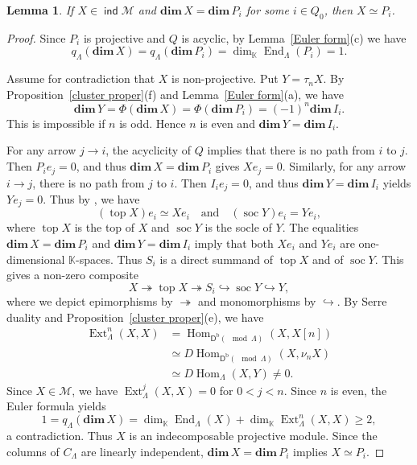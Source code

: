 \documentclass[11pt,a4paper]{amsart}
\newtheorem{lemma}[theorem]{Lemma}
\theoremstyle{definition}
\numberwithin{equation}{section}
\newcommand{\0}{\mathbf{0}}
\newcommand{\dimv}{\mathbf{dim}\,}
\newcommand{\Hom}{\operatorname{Hom}\nolimits}
\newcommand{\End}{\operatorname{End}\nolimits}
\newcommand{\Ext}{\operatorname{Ext}\nolimits}
\newcommand{\topp}{\operatorname{top}\nolimits}
\newcommand{\soc}{\operatorname{soc}\nolimits}
\newcommand{\bo}{\operatorname{b}\nolimits}
\DeclareMathOperator{\ind}{\mathsf{ind}}
\newcommand{\DDD}{\mathsf{D}}
\begin{document}
	
	
	\begin{lemma} \label{projective uniqueness} If $X\in \ind \mathcal{M}$ and $\dimv X=\dimv P_i$ for some $i\in Q_0$, then $X\simeq P_i$. 
		
	\end{lemma}
	\begin{proof}
		Since $P_i$ is projective and $Q$ is acyclic,
		by Lemma~\ref{Euler form}(c) we have
		\[
		q_\Lambda(\dimv X)
		=q_\Lambda(\dimv P_i)
		=\dim_{\mathbb K}\End_\Lambda(P_i)=1.
		\]				
		
		Assume for contradiction that $X$ is non-projective.  Put $Y=\tau_nX$.
		By Proposition~\ref{cluster proper}(f) and
		Lemma~\ref{Euler form}(a), we have
		\[
		\dimv Y=\Phi(\dimv X)
		=\Phi(\dimv P_i)=(-1)^n\dimv I_i.
		\]
		This is impossible if $n$ is odd. Hence $n$ is even
		and $\dimv Y=\dimv I_i$.
		
		For any arrow $j\to i$, the acyclicity of $Q$ implies
		that there is no path from $i$ to $j$. Then $P_ie_j=0$,
		and thus $\dimv X=\dimv P_i$ gives $Xe_j=0$.
		Similarly, for any arrow $i\to j$, there is no path
		from $j$ to $i$. Then $I_ie_j=0$, and thus
		$\dimv Y=\dimv I_i$ yields $Ye_j=0$.  		
		Thus by \cite[III, Lemma 2.2]{ASS}, we have
		$$(\topp X)e_i\simeq Xe_i \quad\text{and}\quad
		(\soc Y)e_i=Ye_i,$$ where $\topp X$ is the top of $X$ and $\soc Y$ is the socle of $Y$. The equalities
		$\dimv X=\dimv P_i$ and $\dimv Y=\dimv I_i$ imply that both  
		$Xe_i$ and $Ye_i$ are one-dimensional $\mathbb K$-spaces.
		Thus $S_i$ is a direct summand of $\topp X$ and of
		$\soc Y$. This gives a non-zero composite
		\[
		X\twoheadrightarrow \topp X \twoheadrightarrow  S_i\hookrightarrow \soc Y \hookrightarrow Y,
		\]
		 where we depict epimorphisms by $\twoheadrightarrow$ 
		and monomorphisms by $\hookrightarrow$. 
		By Serre duality and Proposition~\ref{cluster proper}(e),	we have 	
		\begin{align*}
			\Ext_\Lambda^n(X,X)&= \Hom_{\DDD^{\bo}(\mod \Lambda)}(X,X[n])\\
			&\simeq D\Hom_{\DDD^{\bo}(\mod \Lambda)}(X,\nu_nX)\\
			&\simeq D\Hom_\Lambda(X,Y)\neq0.
		\end{align*}
		Since $X\in\mathcal M$, we have
		$\Ext_\Lambda^j(X,X)=0$ for $0<j<n$.
		Since $n$ is even, the Euler formula yields
		\[
		1=q_\Lambda(\dimv X)
		=\dim_{\mathbb K}\End_\Lambda(X)
		+\dim_{\mathbb K}\Ext_\Lambda^n(X,X)
		\geq2,
		\]
		a contradiction. 		
		Thus $X$ is an indecomposable projective module.
		Since the columns of $C_\Lambda$ are linearly independent,
		$\dimv X=\dimv P_i$ implies $X\simeq P_i$.
	\end{proof}
	
\end{document}
